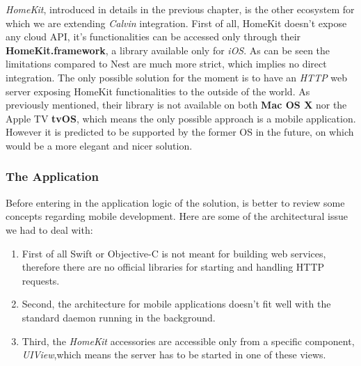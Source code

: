 \textit{HomeKit}, introduced in details in the previous chapter, is the other ecosystem
for which we are extending \textit{Calvin} integration. First of all, HomeKit doesn't
expose any cloud API, it's functionalities can be accessed only through their \textbf{HomeKit.framework},
a library available only for \textit{iOS}. As can be seen the limitations compared to Nest
are much more strict, which implies no direct integration. The only possible solution for the
moment is to have an \textit{HTTP} web server exposing HomeKit functionalities to the outside of
the world. As previously mentioned, their library is not available on both \textbf{Mac OS X} nor
the Apple TV \textbf{tvOS}, which means the only possible approach is a mobile application.
However it is predicted to be supported by the former OS in the future, on which would be a more
elegant and nicer solution.\\

\subsubsection{The Application}

Before entering in the application logic of the solution, is better to review
some concepts regarding mobile development. Here are some of the architectural
issue we had to deal with:


\begin{enumerate}
    \item First of all Swift or Objective-C is not
    meant for building web services, therefore there are no official libraries for
    starting and handling HTTP requests.
    \item Second, the architecture for mobile applications
    doesn't fit well with the standard daemon running in the background.
    \item Third, the \textit{HomeKit} accessories are accessible only from a
    specific component, \textit{UIView},which means the server has to be started
    in one of these views.
\end{enumerate}

